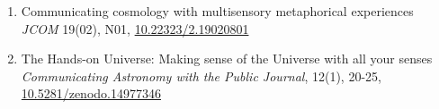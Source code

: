 \begin{enumerate}

\item 
{}
{Communicating cosmology with multisensory metaphorical experiences}
{{\it  JCOM} 19(02), N01, \href{https://doi.org/10.22323/2.19020801}{10.22323/2.19020801}}


\item 
{}
{The Hands-on Universe: Making sense of the Universe with all your senses}{
{\em Communicating Astronomy with the Public Journal}, 12(1), 20-25, \href{https://doi.org/10.5281/zenodo.14977346}{10.5281/zenodo.14977346} } 



\end{enumerate}
\setcounter{nRefSCPapers}{\value{enumi}}
\setcounter{nAllRefPapers}{\value{nRefPhysicsPapers}}
\addtocounter{nAllRefPapers}{\value{nRefMLPapers}}
\addtocounter{nAllRefPapers}{\value{nRefSCPapers}}

\vspace{\baselineskip}


